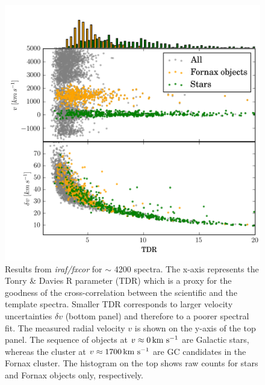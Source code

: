 \documentclass[useAMS,usenatbib]{mn2e}
\newcommand{\kms}{\mbox{\,km~s$^{-1}$}}
\begin{document}
\begin{figure}
\centering
\includegraphics[width=\columnwidth]{figures/fxcor_subplot.png} 
\caption{Results from {\it iraf/fxcor} for $\sim$ 4200 spectra. The x-axis 
represents the Tonry \& Davies R parameter (TDR) which is a proxy for the 
goodness of the cross-correlation between the scientific and the template 
spectra. Smaller TDR corresponds to larger velocity uncertainties $\delta v$ 
(bottom panel) and therefore to a poorer spectral fit. The measured radial 
velocity $v$ is shown on the y-axis of the top panel. The sequence of objects 
at $v\approx 0 \kms$ are Galactic stars, whereas the cluster at 
$v\approx1700\kms$ are GC candidates in the Fornax cluster. The histogram on 
the top shows raw counts for stars and Fornax objects only, respectively. }
\label{fig:tdr}
\end{figure}
\end{document}
